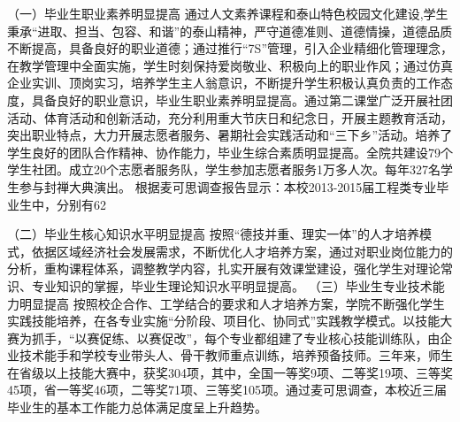 （一）毕业生职业素养明显提高
通过人文素养课程和泰山特色校园文化建设,学生秉承“进取、担当、包容、和谐”的泰山精神，严守道德准则、道德情操，道德品质不断提高，具备良好的职业道德；通过推行“7S”管理，引入企业精细化管理理念，在教学管理中全面实施，学生时刻保持爱岗敬业、积极向上的职业作风；通过仿真企业实训、顶岗实习，培养学生主人翁意识，不断提升学生积极认真负责的工作态度，具备良好的职业意识，毕业生职业素养明显提高。通过第二课堂广泛开展社团活动、体育活动和创新活动，充分利用重大节庆日和纪念日，开展主题教育活动，突出职业特点，大力开展志愿者服务、暑期社会实践活动和“三下乡”活动。培养了学生良好的团队合作精神、协作能力，毕业生综合素质明显提高。全院共建设79个学生社团。成立20个志愿者服务队，学生参加志愿者服务1万多人次。每年327名学生参与封禅大典演出。
根据麦可思调查报告显示：本校2013-2015届工程类专业毕业生中，分别有62%

（二）毕业生核心知识水平明显提高
按照“德技并重、理实一体”的人才培养模式，依据区域经济社会发展需求，不断优化人才培养方案，通过对职业岗位能力的分析，重构课程体系，调整教学内容，扎实开展有效课堂建设，强化学生对理论常识、专业知识的掌握，毕业生理论知识水平明显提高。
（三）毕业生专业技术能力明显提高
按照校企合作、工学结合的要求和人才培养方案，学院不断强化学生实践技能培养，在各专业实施“分阶段、项目化、协同式”实践教学模式。以技能大赛为抓手，“以赛促练、以赛促改”，每个专业都组建了专业核心技能训练队，由企业技术能手和学校专业带头人、骨干教师重点训练，培养预备技师。三年来，师生在省级以上技能大赛中，获奖304项，其中，全国一等奖9项、二等奖19项、三等奖45项，省一等奖46项，二等奖71项、三等奖105项。通过麦可思调查，本校近三届毕业生的基本工作能力总体满足度呈上升趋势。

